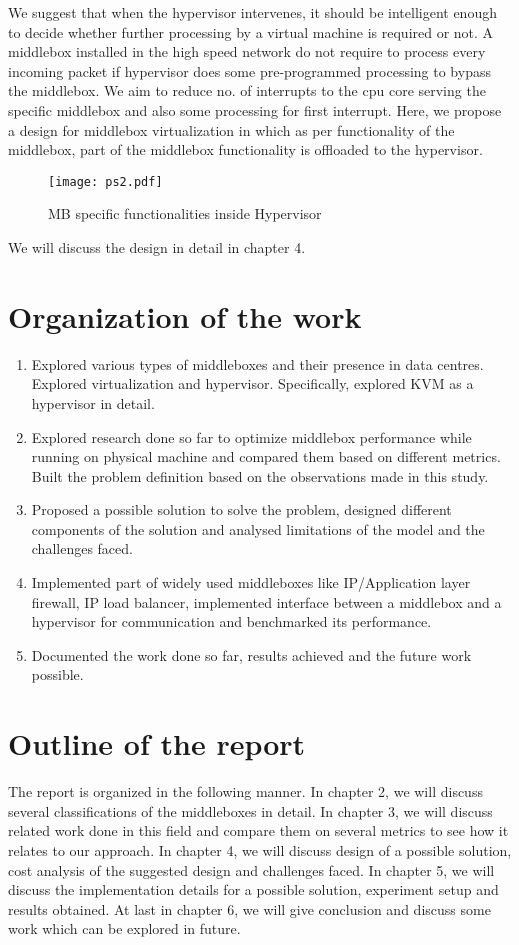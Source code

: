 \documentclass[a4paper,11pt]{report}
\begin{document}
We suggest that when the hypervisor intervenes, it should be intelligent enough to decide whether further processing by a virtual machine is required or not. A middlebox installed in the high speed network do not require to process every incoming packet if hypervisor does some pre-programmed processing to bypass the middlebox. We aim to reduce no. of interrupts to the cpu core serving the specific middlebox and also some processing for first interrupt. Here, we propose a design for middlebox virtualization in which as per functionality of the middlebox, part of the middlebox functionality is offloaded to the hypervisor.
\begin{figure}[h]
\centering
\texttt{[image: ps2.pdf]}
\caption{MB specific functionalities inside Hypervisor}
\end{figure}  

We will discuss the design in detail in chapter 4.           


\section{Organization of the work}
\begin{enumerate}
\item Explored various types of middleboxes and their presence in data centres. Explored virtualization and hypervisor. Specifically, explored KVM as a hypervisor in detail.
\item Explored research done so far to optimize middlebox performance while running on physical machine and compared them based on different metrics. Built the problem definition based on the observations made in this study.
\item Proposed a possible solution to solve the problem, designed different components of the solution and analysed limitations of the model and the challenges faced.        
\item Implemented part of widely used middleboxes like IP/Application layer firewall, IP load balancer, implemented interface between a middlebox and a hypervisor for communication and benchmarked its performance.      
\item Documented the work done so far, results achieved and the future work possible.           
\end{enumerate}
\section{Outline of the report}
The report is organized in the following manner. In chapter 2, we will discuss several classifications of the middleboxes in detail. In chapter 3, we will discuss related work done in this field and compare them on several metrics to see how it relates to our approach. In chapter 4, we will discuss design of a possible solution, cost analysis of the suggested design and challenges faced. In chapter 5, we will discuss the implementation details for a possible solution, experiment setup and results obtained. At last in chapter 6, we will give conclusion and discuss some work which can be explored in future.     
\end{document}
